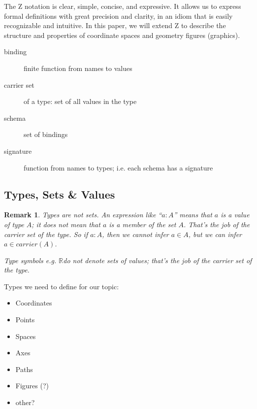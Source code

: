 \documentclass[reqno,12pt]{tufte-handout}
\numberwithin{equation}{subsection}
\numberwithin{equation}{subsection}
\newtheorem{remark}{Remark}
\newcommand\cspace{coordinate space}
\newcommand\R{\(\mathds{R}\)}
\newcommand\RR{\(\mathds{R}\times\mathds{R}\)}
\begin{document}
The Z notation is clear, simple, concise, and expressive.  It allows
us to express formal definitions with great precision and clarity,
in an idiom that is easily recognizable and intuitive.  In this
paper, we will extend Z to describe the structure and properties
of \cspace{}s and geometry figures (graphics).


\begin{description}
\item [binding] finite function from names to values
\item [carrier set] of a type: set of all values in the type
\item [schema] set of bindings
\item [signature] function from names to types; i.e. each schema has a signature
\end{description}

\subsection{Types, Sets \& Values}
\label{sect:types}

\begin{remark}
  Types are not sets. An expression like ``\(a:A\)'' means that \(a\)
  is a value of type \(A\); it does \textit{not} mean that \(a\) is a
  \textit{member} of the set \(A\).  That's the job of the
  \textit{carrier set} of the type.  So if \(a:A\), then we cannot
  infer \(a\in A\), but we can infer \(a\in carrier(A)\).

  Type symbols e.g. \R do not denote sets of values; that's the job of
  the carrier set of the type.
\end{remark}

Types we need to define for our topic:

\begin{itemize}
\item Coordinates
\item Points
\item Spaces
\item Axes
\item Paths
\item Figures (?)
\item other?
\end{itemize}
\end{document}
